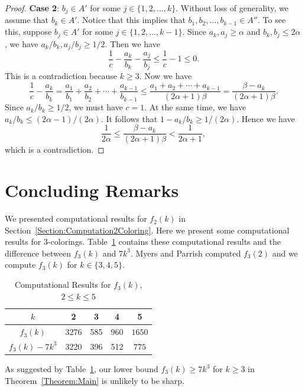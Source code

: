 \documentclass[10pt,a4paper]{amsart}
\begin{document}
\begin{proof}
{\bf Case 2}: $b_j\in A'$ for some $j\in\{1,2,\ldots,k\}$. Without loss of generality, we assume that $b_k\in A'$. Notice that this implies that $b_1,b_2,\ldots,b_{k-1}\in A''$. To see this, suppose $b_j\in A'$ for some $j\in\{1,2,\ldots,k-1\}$. Since $a_k,a_j\geq\alpha$ and $b_k,b_j\leq 2\alpha$, we have $a_k/b_k,a_j/b_j\geq1/2$. Then we have
    \[
    \frac{1}{c}-\frac{a_k}{b_k}-\frac{a_j}{b_j}\leq\frac{1}{c}-1\leq0.
    \]
    This is a contradiction because $k\geq3$. Now we have
    \[
    \frac{1}{c}-\frac{a_k}{b_k}=\frac{a_1}{b_1}+\frac{a_2}{b_2}+\cdots+\frac{a_{k-1}}{b_{k-1}}\leq\frac{a_1+a_2+\cdots+a_{k-1}}{(2\alpha+1)\beta}=\frac{\beta-a_k}{(2\alpha+1)\beta}.
    \]
    Since $a_k/b_k\geq1/2$, we must have $c=1$. At the same time, we have $a_k/b_k\leq (2\alpha-1)/(2\alpha)$. It follows that $1-a_k/b_k\geq1/(2\alpha)$. Hence we have
    \[
    \frac{1}{2\alpha}\leq\frac{\beta-a_k}{(2\alpha+1)\beta}<\frac{1}{2\alpha+1},
    \]
    which is a contradiction.
\end{proof}


\section{Concluding Remarks}\label{Section:Concluding}
We presented computational results for $f_2(k)$ in Section~\ref{Section:Computation2Coloring}. Here we present some computational results for 3-colorings. Table~\ref{Table3} contains these computational results and the difference between $f_3(k)$ and $7k^3$. Myers and Parrish \cite{MyersParrish2018} computed $f_3(2)$ and we compute $f_3(k)$ for $k\in\{3,4,5\}$. 
\begin{table}[H]
\renewcommand{\arraystretch}{1.5}
\centering
\begin{tabular}{|c|c|c|c|c|}
\hline
$k$&2&3&4&5\\\hline
$f_3(k)$&3276&585&960&$1650$\\\hline
$f_3(k)-7k^3$&3220&396&512&$775$\\\hline
\end{tabular}
\caption{Computational Results for $f_3(k)$, $2\leq k\leq 5$}\label{Table3}
\end{table}
As suggested by Table~\ref{Table3}, our lower bound $f_3(k)\geq7k^3$ for $k\geq3$ in Theorem~\ref{Theorem:Main} is unlikely to be sharp.
\end{document}

